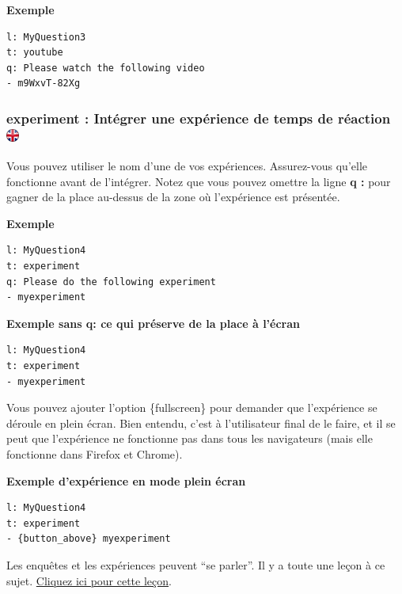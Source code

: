 \documentclass[
]{book}
\begin{document}
\textbf{Exemple}

\begin{verbatim}
l: MyQuestion3
t: youtube
q: Please watch the following video
- m9WxvT-82Xg
\end{verbatim}

\hypertarget{experiment-intuxe9grer-une-expuxe9rience-de-temps-de-ruxe9action}{%
\subsubsection[experiment : Intégrer une expérience de temps de réaction ]{\texorpdfstring{experiment : Intégrer une expérience de temps de réaction \href{https://www.psytoolkit.org/doc3.1.0/online-survey-syntax.html\#experiment}{\protect\includegraphics{img/ukflag.png}}}{experiment : Intégrer une expérience de temps de réaction }}\label{experiment-intuxe9grer-une-expuxe9rience-de-temps-de-ruxe9action}}

Vous pouvez utiliser le nom d'une de vos expériences. Assurez-vous qu'elle fonctionne avant de l'intégrer. Notez que vous pouvez omettre la ligne \textbf{q :} pour gagner de la place au-dessus de la zone où l'expérience est présentée.

\textbf{Exemple}

\begin{verbatim}
l: MyQuestion4
t: experiment
q: Please do the following experiment
- myexperiment
\end{verbatim}

\textbf{Exemple sans q: ce qui préserve de la place à l'écran}

\begin{verbatim}
l: MyQuestion4
t: experiment
- myexperiment
\end{verbatim}

Vous pouvez ajouter l'option \{fullscreen\} pour demander que l'expérience se déroule en plein écran. Bien entendu, c'est à l'utilisateur final de le faire, et il se peut que l'expérience ne fonctionne pas dans tous les navigateurs (mais elle fonctionne dans Firefox et Chrome).

\textbf{Exemple d'expérience en mode plein écran}

\begin{verbatim}
l: MyQuestion4
t: experiment
- {button_above} myexperiment
\end{verbatim}

Les enquêtes et les expériences peuvent ``se parler''. Il y a toute une leçon à ce sujet. \protect\hyperlink{s11}{Cliquez ici pour cette leçon}.
\end{document}
